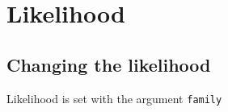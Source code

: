 \section{Likelihood}
\subsection{Changing the likelihood}
Likelihood is set with the argument \texttt{family} 

